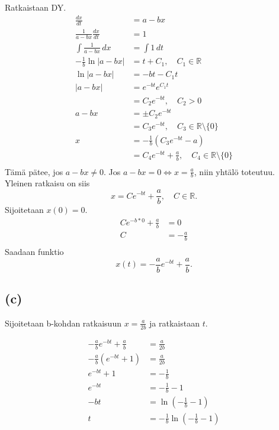 \documentclass{article}
\begin{document}
Ratkaistaan DY.
\begin{align*}
  \frac{dx}{dt} &= a - bx \\
  \frac{1}{a - bx} \frac{dx}{dt} &= 1 \\
  \int \frac{1}{a - bx} \,dx &= \int 1 \,dt \\
  -\frac{1}{b} \ln|a - bx| &= t + C_1, \quad C_1 \in \mathbb{R} \\
  \ln|a - bx| &= -bt - C_1t \\
  |a - bx| &= e^{-bt} e^{C_1t} \\
           &= C_2 e^{-bt}, \quad C_2 > 0 \\
  a - bx &= \pm C_2 e^{-bt} \\
         &= C_3 e^{-bt}, \quad C_3 \in \mathbb{R} \setminus \{0\} \\
  x &= -\frac{1}{b}(C_3 e^{-bt} - a) \\
    &= C_4e^{-bt} + \frac{a}{b}, \quad C_4 \in \mathbb{R} \setminus \{0\} \\
\end{align*}
Tämä pätee, jos $a - bx \neq 0$.
Jos $a - bx = 0 \iff x = \frac{a}{b}$, niin yhtälö toteutuu.
Yleinen ratkaisu on siis
\[
  x = Ce^{-bt} + \frac{a}{b}, \quad C \in \mathbb{R}.
\]
Sijoitetaan $x(0) = 0$.
\begin{align*}
  Ce^{-b*0} + \frac{a}{b} &= 0 \\
  C &= -\frac{a}{b} \\
\end{align*}
Saadaan funktio
\[
  x(t) = -\frac{a}{b}e^{-bt} + \frac{a}{b}.
\]

\subsection*{(c)}

Sijoitetaan b-kohdan ratkaisuun $x = \frac{a}{2b}$
ja ratkaistaan $t$.

\begin{align*}
  -\frac{a}{b}e^{-bt} + \frac{a}{b} &= \frac{a}{2b} \\
  -\frac{a}{b}(e^{-bt} + 1) &= \frac{a}{2b} \\
  e^{-bt} + 1 &= -\frac{1}{b} \\
  e^{-bt} &= -\frac{1}{b} - 1 \\
  -bt &= \ln(-\frac{1}{b} - 1) \\
  t &= -\frac{1}{b}\ln(-\frac{1}{b} - 1) \\
\end{align*}
\end{document}
